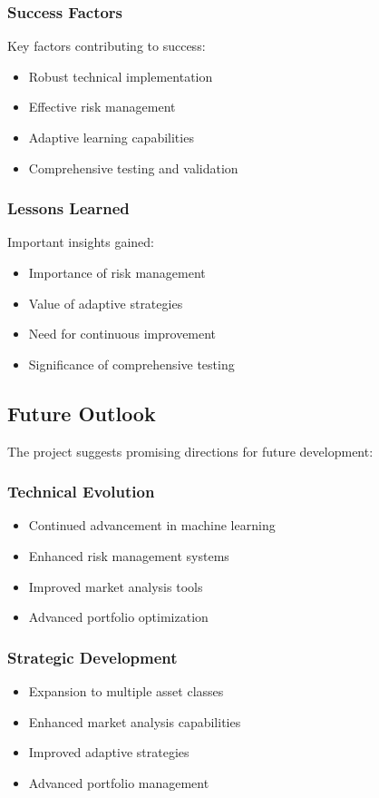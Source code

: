 \documentclass[conference]{IEEEtran}
\begin{document}
\subsubsection{Success Factors}
Key factors contributing to success:
\begin{itemize}
    \item Robust technical implementation
    \item Effective risk management
    \item Adaptive learning capabilities
    \item Comprehensive testing and validation
\end{itemize}

\subsubsection{Lessons Learned}
Important insights gained:
\begin{itemize}
    \item Importance of risk management
    \item Value of adaptive strategies
    \item Need for continuous improvement
    \item Significance of comprehensive testing
\end{itemize}

\subsection{Future Outlook}
The project suggests promising directions for future development:

\subsubsection{Technical Evolution}
\begin{itemize}
    \item Continued advancement in machine learning
    \item Enhanced risk management systems
    \item Improved market analysis tools
    \item Advanced portfolio optimization
\end{itemize}

\subsubsection{Strategic Development}
\begin{itemize}
    \item Expansion to multiple asset classes
    \item Enhanced market analysis capabilities
    \item Improved adaptive strategies
    \item Advanced portfolio management
\end{itemize}
\end{document}
